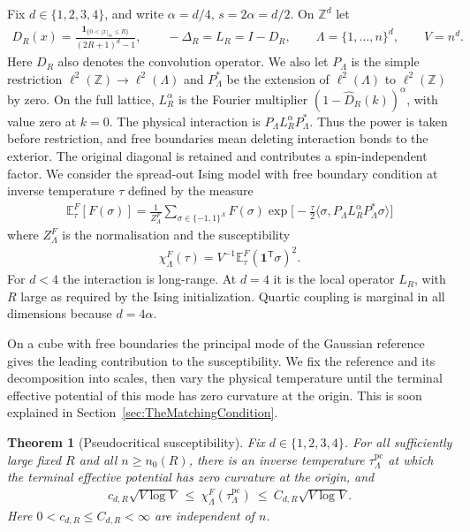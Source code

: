 \documentclass[11pt]{article}
\newtheorem{theorem}{Theorem}[section]
\theoremstyle{definition}
\newcommand{\one}{\mathbf 1}
\newcommand{\E}{\mathbb E}
\begin{document}
Fix \(d\in\{1,2,3,4\}\), and write \(\alpha=d/4\), \(s=2\alpha=d/2\).
On \(\mathbb Z^d\) let
\begin{align}
 D_R(x)=\frac{\one_{\{0<|x|_\infty\le R\}}}{(2R+1)^d-1},
 \qquad -\Delta_R=L_R=I-D_R,\qquad
 \Lambda=\{1,\ldots,n\}^d,\qquad V=n^d .
\end{align}
Here \(D_R\) also denotes the convolution operator. 
We also let $P_{\Lambda}$ is the simple restriction $\ell^2 (\mathbb{Z}) \rightarrow \ell^2 (\Lambda)$
and $P_\Lambda^*$ be the extension of $\ell^2 (\Lambda)$ to $\ell^2 (\mathbb{Z})$ by zero.
On the full
lattice, \(L_R^\alpha\) is the Fourier multiplier
\((1-\widehat D_R(k))^\alpha\), with value zero at \(k=0\).
The physical interaction is
\(P_\Lambda L_R^\alpha P_\Lambda^*\).
Thus the power is taken before restriction, and free boundaries
mean deleting interaction bonds to the exterior. The original diagonal
is retained and contributes a spin-independent factor.
We consider the spread-out Ising model with free boundary condition at inverse temperature \(\tau\) 
defined by the measure
\begin{align}
      \mathbb{E}_\tau^F [F(\sigma)]
      = \frac{1}{Z_\Lambda^{F}} \sum_{ \sigma\in\{-1,1\}^\Lambda } F(\sigma)  \exp\bigl[-\tfrac{\tau}{2}
      \langle\sigma, P_\Lambda L_R^\alpha P_\Lambda^*\sigma\rangle\bigr] 
      \label{eq:measure}
\end{align}
where $Z_\Lambda^F$ is the normalisation and the susceptibility
\begin{align}
 \chi_{\Lambda}^F(\tau)=V^{-1}\E_\tau^F
                         (\one^{\mathsf T}\sigma)^2 .
\end{align}
For \(d<4\) the interaction is long-range. At \(d=4\) it is the local
operator \(L_R\), with \(R\) large as required by the Ising initialization.
Quartic coupling is marginal in all dimensions because $d = 4\alpha$.

On a cube with free boundaries the principal mode of the Gaussian
reference gives the leading contribution to the susceptibility.
We fix the reference and its decomposition into scales, then vary the
physical temperature until the terminal effective potential of this mode
has zero curvature at the origin.
This is soon explained in Section~\ref{sec:TheMatchingCondition}.

\begin{theorem}[Pseudocritical susceptibility]
\label{thm:susceptibility}
Fix \(d\in\{1,2,3,4\}\). For all sufficiently large fixed \(R\)
and all \(n\ge n_0(R)\), there is an inverse temperature
\(\tau_{\Lambda}^{\mathrm{pc}}\) at which the terminal effective
potential has zero curvature at the origin, and
\begin{align}
 c_{d,R}\sqrt{V\log V}\ \le\
 \chi_{\Lambda}^F(\tau_{\Lambda}^{\mathrm{pc}})
 \ \le\ C_{d,R}\sqrt{V\log V}.
\end{align}
Here \(0<c_{d,R}\le C_{d,R}<\infty\) are independent of \(n\).
\end{theorem}
\end{document}
